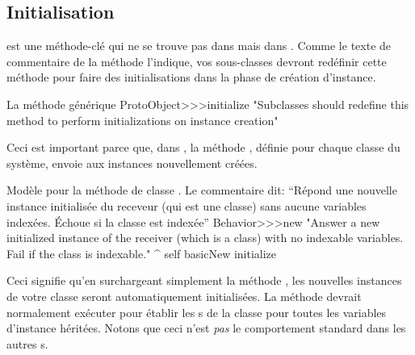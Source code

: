 \documentclass[a4paper,10pt,twoside]{book}
\begin{document}

\subsection{Initialisation}
 est une méthode-clé qui ne se
trouve pas dans  mais dans .
Comme le texte de commentaire de la méthode l'indique, vos sous-classes
devront redéfinir cette méthode pour faire des initialisations
dans la phase de création d'instance.

\begin{method}{La méthode générique }
ProtoObject>>>initialize
   "Subclasses should redefine this method to perform initializations on instance creation"
\end{method}

Ceci est important parce que, dans \pharo, 
 la méthode , définie pour chaque classe du
système, envoie  aux instances nouvellement
créées.

\begin{method}{Modèle pour la méthode de classe . Le commentaire dit: ``Répond une nouvelle instance initialisée du receveur (qui est une classe) sans aucune variables indexées. Échoue si la classe est indexée''}
Behavior>>>new
    "Answer a new initialized instance of the receiver (which is a class) with no indexable variables. Fail if the class is indexable."
    ^ self basicNew initialize
\end{method}

Ceci signifie qu'en surchargeant simplement la méthode  , les nouvelles instances de votre classe seront automatiquement initialisées. La méthode  devrait normalement exécuter  pour établir les s de la classe pour toutes les variables d'instance héritées.
Notons que ceci n'est \emph{pas} le comportement standard dans les autres \st{}s.

\end{document}
